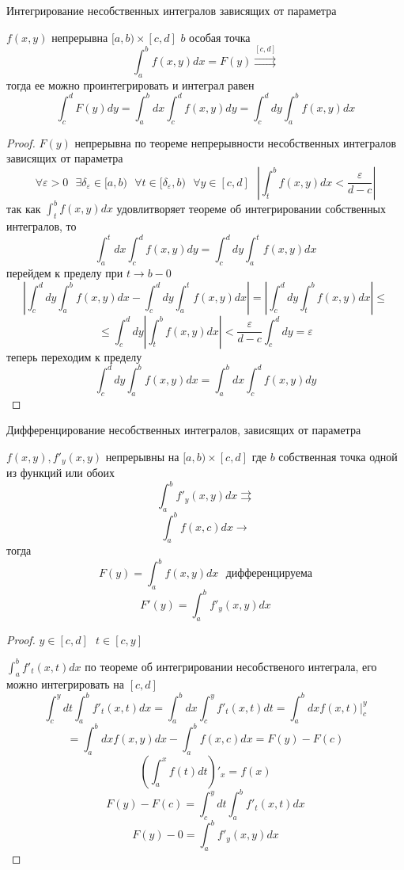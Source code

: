 \begin{title}[\Large]
  Интегрирование несобственных интегралов зависящих от параметра
\end{title}

\begin{theorem}
  $f(x,y)$ непрерывна $[a,b) \times [c,d]$ $b$ особая точка
  $$
  \int_a^b f(x,y) dx = F(y) \stackrel{[c,d]}{\rightrightarrows}
  $$
  тогда ее можно проинтегрировать и интеграл равен
  $$
  \int_c^d F(y) dy
  =
  \int_a^b dx \int_c^d f(x,y) dy
  =
  \int_c^d dy \int_a^b f(x,y) dx
  $$
\end{theorem}

\begin{proof}
  $F(y)$ непрерывна по теореме непрерывности несобственных интегралов зависящих
  от параметра
  $$
  \forall \varepsilon > 0
  ~~~
  \exists \delta_{\varepsilon} \in [a, b)
  ~~~
  \forall t \in [\delta_{\varepsilon}, b)
  ~~~
  \forall y \in [c,d]
  ~~~
  \left|
    \int_t^b f(x,y) dx < \frac{\varepsilon}{d-c}
  \right|
  $$
  так как $\int_t^b f(x,y) dx$ удовлитворяет теореме об интегрировании
  собственных интегралов, то
  $$
  \int_a^t dx \int_c^d f(x,y) dy =
  \int_c^d dy \int_a^t f(x,y) dx
  $$
  перейдем к пределу при $t \to b -0$
  $$
  \left|
    \int_c^d dy \int_a^b f(x,y) dx
    -
    \int_c^d dy \int_a^t f(x,y) dx
  \right|
  =
  \left|
    \int_c^d dy \int_t^b f(x,y) dx
  \right|
  \le
  $$
  $$
  \le
  \int_c^d dy
  \left|
    \int_t^b f(x,y) dx
  \right|
  <
  \frac{\varepsilon}{d-c} \int_c^d dy = \varepsilon
  $$
  теперь переходим к пределу
  $$
  \int_c^d dy \int_a^b f(x,y) dx
  =
  \int_a^b dx \int_c^d f(x,y) dy
  $$
\end{proof}

\begin{title}[\Large]
  Дифференцирование несобственных интегралов, зависящих от параметра
\end{title}

\begin{theorem}
  $f(x,y), f'_y (x,y)$ непрерывны на $[a,b) \times [c,d]$ где $b$ собственная
  точка одной из функций или обоих
  $$
  \int_a^b f'_y (x,y) dx \rightrightarrows
  $$
  $$
  \int_a^b f(x,c) dx \rightarrow
  $$
  тогда
  $$
  F(y) = \int_a^b f (x,y) dx ~~~ \text{дифференцируема}
  $$
  $$
  F'(y) = \int_a^b f'_y (x,y) dx
  $$
\end{theorem}

\begin{proof}
  $y \in [c,d] ~~~ t \in [c,y]$

  $\int_a^b f'_t(x,t)dx$ по теореме об интегрировании несобственого интеграла,
  его можно интегрировать на $[c,d]$
  $$
  \int_c^y dt \int_a^b f'_t(x, t) dx
  =
  \int_a^b dx \int_c^y f'_t(x,t) dt
  =
  \int_a^b dx f(x,t)|_c^y
  $$
  $$
  =
  \int_a^b dx f(x,y) dx - \int_a^b f(x,c)dx = F(y) - F(c)
  $$
  $$
  \left( \int_a^x f(t) dt \right)'_x = f(x)
  $$
  $$
  F(y) - F(c) = \int_c^y dt \int_a^b f'_t(x,t) dx
  $$
  $$
  F(y) - 0 = \int_a^b f'_y(x,y) dx
  $$
\end{proof}

